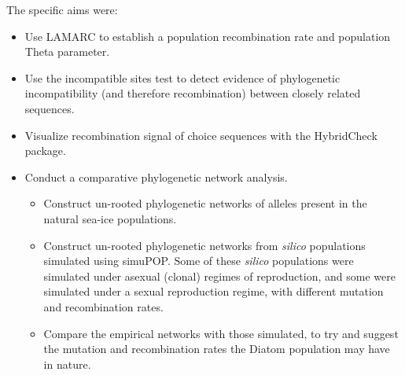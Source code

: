 The specific aims were:
\begin{itemize}
    \item Use LAMARC to establish a population recombination rate and population
    Theta parameter.
    \item Use the incompatible sites test to detect evidence of phylogenetic
    incompatibility (and therefore recombination) between closely related
    sequences.
    \item Visualize recombination signal of choice sequences with the
    HybridCheck package.
    \item Conduct a comparative phylogenetic network analysis.
    \begin{itemize}
        \item Construct un-rooted phylogenetic networks of alleles present
        in the natural sea-ice populations.
        \item Construct un-rooted phylogenetic networks from \textit{silico}
        populations simulated using simuPOP.
        Some of these \textit{silico} populations were simulated under asexual
        (clonal) regimes of reproduction, and some were simulated under a
        sexual reproduction regime, with different mutation and
        recombination rates.
        \item Compare the empirical networks with those simulated, to try
        and suggest the mutation and recombination rates the Diatom
        population may have in nature.
    \end{itemize}
\end{itemize}

